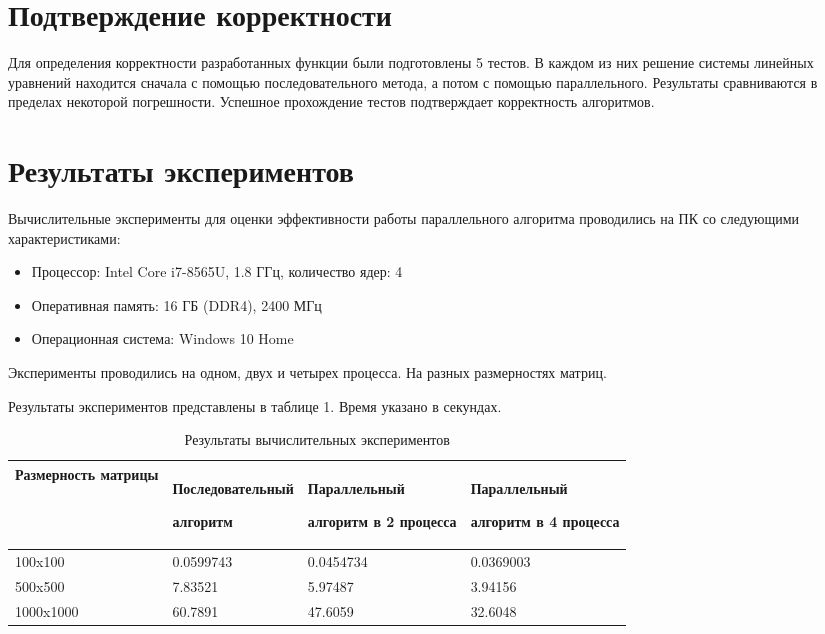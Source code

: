 \documentclass{report}
\begin{document}
\section*{Подтверждение корректности}
Для определения корректности разработанных функции были подготовлены 5 тестов. В каждом из них решение системы линейных уравнений находится сначала с помощью последовательного метода, а потом с помощью параллельного. Результаты сравниваются в пределах некоторой погрешности. Успешное прохождение тестов подтверждает корректность алгоритмов.
\newpage

\section*{Результаты экспериментов}
Вычислительные эксперименты для оценки эффективности работы параллельного алгоритма проводились на ПК со следующими характеристиками:
\begin{itemize}
\item Процессор: Intel Core i7-8565U, 1.8 ГГц, количество ядер: 4
\item Оперативная память: 16 ГБ (DDR4), 2400 МГц
\item Операционная система: Windows 10 Home
\end{itemize}

\par Эксперименты проводились на одном, двух и четырех процесса. На разных размерностях матриц.

\par Результаты экспериментов представлены в таблице 1. Время указано в секундах. 

\begin{table}[!h]
\caption{Результаты вычислительных экспериментов}
\centering
\begin{tabular}{| p{3cm} | p{4cm} | p{4cm} | p{4cm} |}
\hline
Размерность матрицы & Последовательный\par алгоритм & Параллельный\par алгоритм в 2 процесса & Параллельный \par алгоритм в 4 процесса  \\[5pt]
\hline
100x100    & 0.0599743   & 0.0454734   & 0.0369003       \\
\hline
500x500    & 7.83521     & 5.97487     & 3.94156  \\
\hline
1000x1000  & 60.7891     & 47.6059     & 32.6048       \\
\hline
\end{tabular}
\end{table}
\end{document}
